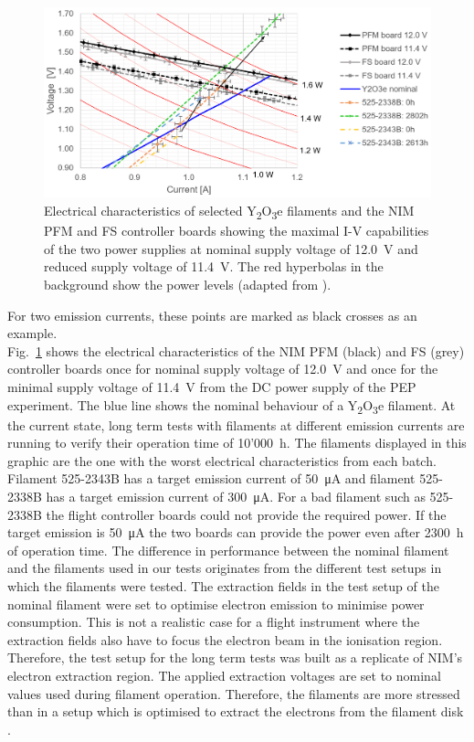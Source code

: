 		\begin{figure}[h!]
			\centering
			\includegraphics[width=\textwidth]{Bilder/Filament_RicosGraph.png}
			\caption{Electrical characteristics of selected Y\textsubscript{2}O\textsubscript{3}e filaments and the NIM PFM and FS controller boards showing the maximal I-V capabilities of the two power supplies at nominal supply voltage of 12.0~V and reduced supply voltage of 11.4~V. The red hyperbolas in the background show the power levels (adapted from \cite{Diss_Fausch}).}
			\label{fig:FilRico}
		\end{figure}
		For two emission currents, these points are marked as black crosses as an example.\\
		Fig.~\ref{fig:FilRico} shows the electrical characteristics of the NIM PFM (black) and FS (grey) controller boards once for nominal supply voltage of 12.0~V and once for the minimal supply voltage of 11.4~V from the DC power supply of the PEP experiment. The blue line shows the nominal behaviour of a Y\textsubscript{2}O\textsubscript{3}e filament. At the current state, long term tests with filaments at different emission currents are running to verify their operation time of 10'000~h. The filaments displayed in this graphic are the one with the worst electrical characteristics from each batch. Filament 525-2343B has a target emission current of 50~\si{\micro\ampere} and filament 525-2338B has a target emission current of 300~\si{\micro\ampere}. For a bad filament such as 525-2338B the flight controller boards could not provide the required power. If the target emission is 50~\si{\micro\ampere} the two boards can provide the power even after 2300~h of operation time. The difference in performance between the nominal filament and the filaments used in our tests originates from the different test setups in which the filaments were tested. The extraction fields in the test setup of the nominal filament were set to optimise electron emission to minimise power consumption. This is not a realistic case for a flight instrument where the extraction fields also have to focus the electron beam in the ionisation region. Therefore, the test setup for the long term tests was built as a replicate of NIM's electron extraction region. The applied extraction voltages are set to nominal values used during filament operation. Therefore, the filaments are more stressed than in a setup which is optimised to extract the electrons from the filament disk \cite{Diss_Fausch}.
		
